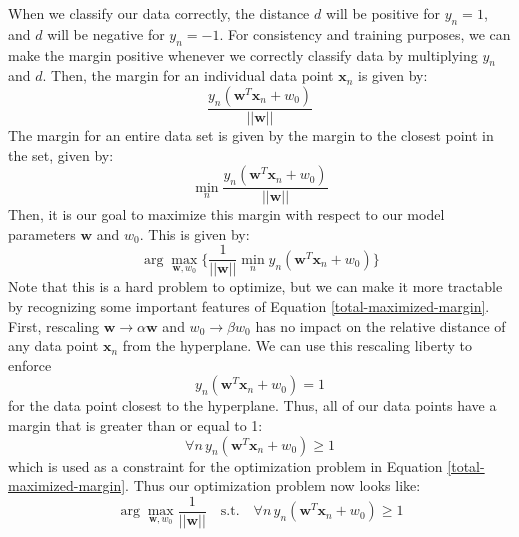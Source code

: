 When we classify our data correctly, the distance $d$ will be positive for $y_{n} = 1$, and $d$ will be negative for $y_{n} = -1$. For consistency and training purposes, we can make the margin positive whenever we correctly classify data by multiplying $y_{n}$ and $d$. Then, the margin for an individual data point $\textbf{x}_{n}$ is given by:
\begin{equation} \label{individual-margin}
	\frac{y_{n}(\textbf{w}^{T}\textbf{x}_{n} + w_{0})}{||\textbf{w}||}
\end{equation}
The margin for an entire data set is given by the margin to the closest point in the set, given by:
\begin{equation} \label{total-margin}
	\min_{n} \frac{y_{n}(\textbf{w}^{T}\textbf{x}_{n} + w_{0})}{||\textbf{w}||}
\end{equation}
Then, it is our goal to maximize this margin with respect to our model parameters $\textbf{w}$ and $w_{0}$. This is given by:
\begin{equation} \label{total-maximized-margin}
	\arg\max_{\textbf{w}, w_{0}} \big\{ \frac{1}{||\textbf{w}||} \min_{n} y_{n}(\textbf{w}^{T}\textbf{x}_{n} + w_{0}) \big\}
\end{equation}
Note that this is a hard problem to optimize, but we can make it more tractable by recognizing some important features of Equation \ref{total-maximized-margin}. First, rescaling $\textbf{w} \rightarrow \alpha \textbf{w}$ and $w_{0} \rightarrow \beta w_{0}$ has no impact on the relative distance of any data point $\textbf{x}_{n}$ from the hyperplane. We can use this rescaling liberty to enforce
\begin{equation} \label{enfore-dist-to-1}
	y_{n}(\textbf{w}^{T}\textbf{x}_{n} + w_{0}) = 1
\end{equation}
for the data point closest to the hyperplane. Thus, all of our data points have a margin that is greater than or equal to 1:
\begin{equation} \label{new-margin-constraint}
	\forall n \, y_{n}(\textbf{w}^{T}\textbf{x}_{n} + w_{0}) \geq 1
\end{equation}
which is used as a constraint for the optimization problem in Equation \ref{total-maximized-margin}. Thus our optimization problem now looks like:
\begin{equation} \label{simplified-maximized-margin-optimization}
	\arg\max_{\textbf{w}, w_{0}} \frac{1}{||\textbf{w}||} \quad \text{s.t.} \quad \forall n \, y_{n}(\textbf{w}^{T}\textbf{x}_{n} + w_{0}) \geq 1
\end{equation}
